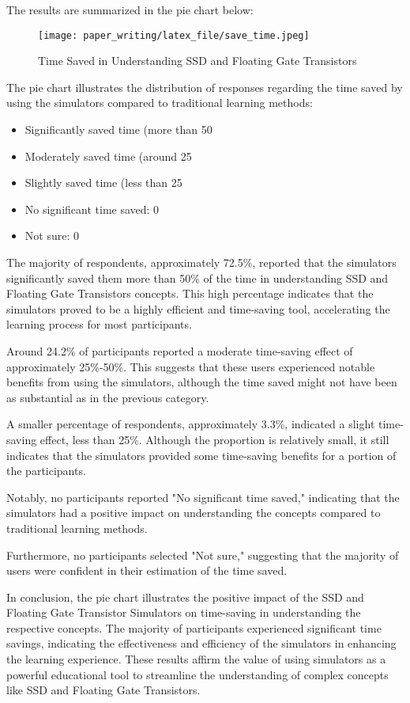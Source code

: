 \documentclass[conference]{paper_writing/latex_file/IEEEtran}
\begin{document}
The results are summarized in the pie chart below:
\begin{figure}[h]
    \centering
    \texttt{[image: paper\_writing/latex\_file/save\_time.jpeg]}
    \caption{Time Saved in Understanding SSD and Floating Gate Transistors}
    \label{fig:enter-label}
\end{figure}
The pie chart illustrates the distribution of responses regarding the time saved by using the simulators compared to traditional learning methods:
\begin{itemize}
    \item Significantly saved time (more than 50%
    \item Moderately saved time (around 25%
    \item Slightly saved time (less than 25%
    \item No significant time saved: 0%
    \item Not sure: 0%
\end{itemize}
The majority of respondents, approximately 72.5\%, reported that the simulators significantly saved them more than 50\% of the time in understanding SSD and Floating Gate Transistors concepts. This high percentage indicates that the simulators proved to be a highly efficient and time-saving tool, accelerating the learning process for most participants.

Around 24.2\% of participants reported a moderate time-saving effect of approximately 25\%-50\%. This suggests that these users experienced notable benefits from using the simulators, although the time saved might not have been as substantial as in the previous category.

A smaller percentage of respondents, approximately 3.3\%, indicated a slight time-saving effect, less than 25\%. Although the proportion is relatively small, it still indicates that the simulators provided some time-saving benefits for a portion of the participants.

Notably, no participants reported "No significant time saved," indicating that the simulators had a positive impact on understanding the concepts compared to traditional learning methods.

Furthermore, no participants selected "Not sure," suggesting that the majority of users were confident in their estimation of the time saved.

In conclusion, the pie chart illustrates the positive impact of the SSD and Floating Gate Transistor Simulators on time-saving in understanding the respective concepts. The majority of participants experienced significant time savings, indicating the effectiveness and efficiency of the simulators in enhancing the learning experience. These results affirm the value of using simulators as a powerful educational tool to streamline the understanding of complex concepts like SSD and Floating Gate Transistors.
\end{document}
